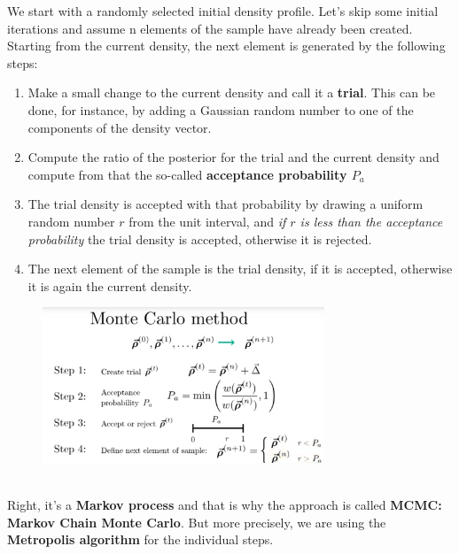 \documentclass[12pt, a4paper]{scrartcl}
\begin{document}
We start with a randomly selected initial density profile. Let’s skip
some initial iterations and assume n elements of the sample have already
been created. 
Starting from the current density, the next element is generated by the
following steps:
\begin{enumerate}
\item Make a small change to the current density and call it a \textbf{trial}. 
This can be done, for instance, by adding a Gaussian random number
to one of the components of the density vector.
\item Compute the ratio of the posterior for the trial and the current
density and compute from that the so-called  \textbf{acceptance probability $P_a$}
\item The trial density is accepted with that probability by drawing
a uniform random number $r$ from the unit interval, and \textit{if $r$ is less than
the acceptance probability} the trial density is accepted, otherwise it is
rejected.
\item The next element of the sample is the trial density, if it is
accepted, otherwise it is again the current density.
\end{enumerate}%
 \begin{figure}[H]
	\centering
	\includegraphics[width=0.75\textwidth]{9_6.png}
\end{figure}

\\

Right, it’s a  \textbf{Markov process} and that is why the approach is called  \textbf{MCMC:
Markov Chain Monte Carlo}. But more precisely, we are using the  \textbf{Metropolis
algorithm} for the individual steps. \\
\end{document}

